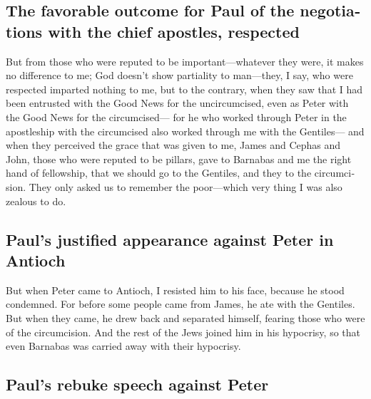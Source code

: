\begin{paracol}{2}
\begin{otherlanguage}{english}
\hypertarget{the-favorable-outcome-for-paul-of-the-negotiations-with-the-chief-apostles-respected}{%
\subsection{The favorable outcome for Paul of the negotiations with the
chief apostles,
respected}\label{the-favorable-outcome-for-paul-of-the-negotiations-with-the-chief-apostles-respected}}

 But from those who were reputed to be
important---whatever they were, it makes no difference to me; God
doesn't show partiality to man---they, I say, who were respected
imparted nothing to me,  but to the contrary, when they
saw that I had been entrusted with the Good News for the uncircumcised,
even as Peter with the Good News for the circumcised--- 
for he who worked through Peter in the apostleship with the circumcised
also worked through me with the Gentiles---  and when they
perceived the grace that was given to me, James and Cephas and John,
those who were reputed to be pillars, gave to Barnabas and me the right
hand of fellowship, that we should go to the Gentiles, and they to the
circumcision.  They only asked us to remember the
poor---which very thing I was also zealous to do.

\hypertarget{pauls-justified-appearance-against-peter-in-antioch}{%
\subsection{Paul's justified appearance against Peter in
Antioch}\label{pauls-justified-appearance-against-peter-in-antioch}}

 But when Peter came to Antioch, I resisted him to his
face, because he stood condemned.  For before some people
came from James, he ate with the Gentiles. But when they came, he drew
back and separated himself, fearing those who were of the circumcision.
 And the rest of the Jews joined him in his hypocrisy, so
that even Barnabas was carried away with their hypocrisy.

\hypertarget{pauls-rebuke-speech-against-peter}{%
\subsection{Paul's rebuke speech against
Peter}\label{pauls-rebuke-speech-against-peter}}


\end{otherlanguage}
\end{paracol}
